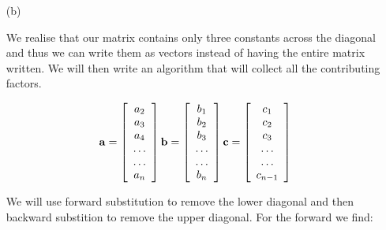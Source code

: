 \documentclass{article}
\newcommand{\beq}{\begin{equation}}
\newcommand{\eeq}{\end{equation}}
\begin{document}
\begin{enumerate}
 
\item[(b)]
 
We realise that our matrix contains only three constants across the diagonal and thus we can write them as vectors instead of having the entire matrix written. We will then write an algorithm that will collect all the contributing factors.
 
\beq
    {\bf a} = \left[\begin{array}{c}
                           a_2\\
                           a_3\\
                           a_4\\
                          \dots  \\
                          \dots \\
                           a_n\\
                      \end{array} \right]
    {\bf b} = \left[\begin{array}{c}
                           b_1\\
                           b_2\\
                           b_3\\
                          \dots  \\
                          \dots \\
                           b_n\\
                      \end{array} \right]
    {\bf c} =\left[\begin{array}{c}
                           c_1\\
                           c_2\\
                           c_3\\
                          \dots  \\
                          \dots \\
                           c_{n-1}\\
                      \end{array} \right]
\eeq
 
We will use forward substitution to remove the lower diagonal and then backward substition to remove the upper diagonal.
For the forward we find:
 

\end{enumerate}
\end{document}

